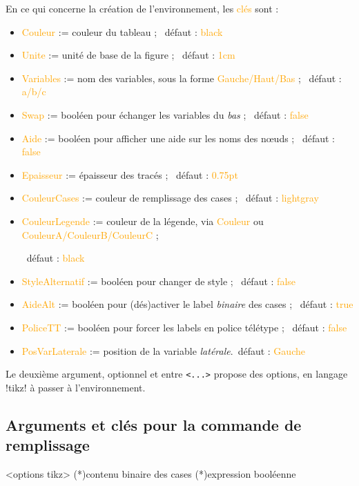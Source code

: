 \documentclass[french,a4paper,11pt]{article}
\newcommand\Cle[1]{{\small\sffamily\textlangle \textcolor{orange}{#1}\textrangle}}
\begin{document}
{{\begin{tipblock}
En ce qui concerne la création de l'environnement, les \Cle{clés} sont :

\begin{itemize}
	\item \Cle{Couleur} := couleur du tableau ; \hfill~défaut : \Cle{black}
	\item \Cle{Unite} := unité de base de la figure ; \hfill~défaut : \Cle{1cm}
	\item \Cle{Variables} := nom des variables, sous la forme \Cle{Gauche/Haut/Bas} ; \hfill~défaut : \Cle{a/b/c}
	\item \Cle{Swap} := booléen pour échanger les variables du \textit{bas} ; \hfill~défaut : \Cle{false}
	\item \Cle{Aide} := booléen pour afficher une aide sur les noms des nœuds ; \hfill~défaut : \Cle{false}
	\item \Cle{Epaisseur} := épaisseur des tracés ; \hfill~défaut : \Cle{0.75pt}
	\item \Cle{CouleurCases} := couleur de remplissage des cases ; \hfill~défaut : \Cle{lightgray}
	\item \Cle{CouleurLegende} := couleur de la légende, via \Cle{Couleur} ou \Cle{CouleurA/CouleurB/CouleurC} ;
	
	\hfill~défaut : \Cle{black}
	\item \Cle{StyleAlternatif} := booléen pour changer de style ; \hfill~défaut : \Cle{false}
	\item \Cle{AideAlt} := booléen pour (dés)activer le label \textit{binaire} des cases ; \hfill~défaut : \Cle{true}
	\item \Cle{PoliceTT} := booléen pour forcer les labels en police télétype ; \hfill~défaut : \Cle{false}
	\item \Cle{PosVarLaterale} := position de la variable \textit{latérale}.\hfill~défaut : \Cle{Gauche}
\end{itemize}

Le deuxième argument, optionnel et entre \texttt{<...>} propose des options, en langage \packagetex!tikz! à passer à l'environnement.
\end{tipblock}

\subsection{Arguments et clés pour la commande de remplissage}

\begin{DemoCode}
\begin{TableKarnaugh}[clés]<options tikz>
	\KarnaughCasesResult(*){contenu binaire des cases}
	\KarnaughCasesAuto(*){expression booléenne}
\end{TableKarnaugh}
\end{DemoCode}

}}
\end{document}
